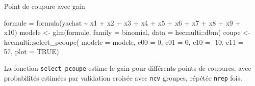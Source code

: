 \documentclass[
  ignorenonframetext,
]{beamer}
\newenvironment{Shaded}{\begin{snugshade}}{\end{snugshade}}
\newcommand{\AttributeTok}[1]{\textcolor[rgb]{0.40,0.45,0.13}{#1}}
\newcommand{\ConstantTok}[1]{\textcolor[rgb]{0.56,0.35,0.01}{#1}}
\newcommand{\DecValTok}[1]{\textcolor[rgb]{0.68,0.00,0.00}{#1}}
\newcommand{\FunctionTok}[1]{\textcolor[rgb]{0.28,0.35,0.67}{#1}}
\newcommand{\NormalTok}[1]{\textcolor[rgb]{0.00,0.23,0.31}{#1}}
\newcommand{\OtherTok}[1]{\textcolor[rgb]{0.00,0.23,0.31}{#1}}
\newcommand{\SpecialCharTok}[1]{\textcolor[rgb]{0.37,0.37,0.37}{#1}}
\begin{document}
\begin{frame}[fragile]{Point de coupure avec gain}
\protect\hypertarget{point-de-coupure-avec-gain}{}
\begin{Shaded}
\begin{Highlighting}[numbers=left,,]
\NormalTok{formule }\OtherTok{=} \FunctionTok{formula}\NormalTok{(yachat }\SpecialCharTok{\textasciitilde{}}\NormalTok{ x1 }\SpecialCharTok{+}\NormalTok{ x2 }\SpecialCharTok{+}\NormalTok{ x3 }\SpecialCharTok{+}
\NormalTok{                    x4 }\SpecialCharTok{+}\NormalTok{ x5 }\SpecialCharTok{+}\NormalTok{ x6 }\SpecialCharTok{+}\NormalTok{ x7 }\SpecialCharTok{+} 
\NormalTok{                    x8 }\SpecialCharTok{+}\NormalTok{ x9 }\SpecialCharTok{+}\NormalTok{ x10)}
\NormalTok{modele }\OtherTok{\textless{}{-}} \FunctionTok{glm}\NormalTok{(formule, }
              \AttributeTok{family =}\NormalTok{ binomial, }
              \AttributeTok{data =}\NormalTok{ hecmulti}\SpecialCharTok{::}\NormalTok{dbm)}
\NormalTok{coupe }\OtherTok{\textless{}{-}}\NormalTok{ hecmulti}\SpecialCharTok{::}\FunctionTok{select\_pcoupe}\NormalTok{(}
  \AttributeTok{modele =}\NormalTok{ modele, }
  \AttributeTok{c00 =} \DecValTok{0}\NormalTok{, }
  \AttributeTok{c01 =} \DecValTok{0}\NormalTok{, }
  \AttributeTok{c10 =} \SpecialCharTok{{-}}\DecValTok{10}\NormalTok{, }
  \AttributeTok{c11 =} \DecValTok{57}\NormalTok{,}
  \AttributeTok{plot =} \ConstantTok{TRUE}\NormalTok{)}
\end{Highlighting}
\end{Shaded}

\footnotesize

La fonction \texttt{select\_pcoupe} estime le gain pour différents
points de coupures, avec probabilités estimées par validation croisée
avec \texttt{ncv} groupes, répétée \texttt{nrep} fois.

\normalsize
\end{frame}
\end{document}
